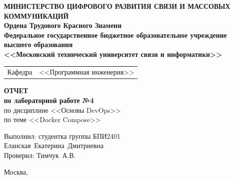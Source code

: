 \thispagestyle{empty}

\begin{center}
	\textbf{МИНИСТЕРСТВО ЦИФРОВОГО РАЗВИТИЯ СВЯЗИ И МАССОВЫХ КОММУНИКАЦИЙ} \\
	\textbf{Ордена Трудового Красного Знамени \\
	Федеральное государственное бюджетное образовательное учреждение высшего образования \\
	<<Московский технический университет связи и информатики>>}
\end{center}

\vspace{0.3em}

\begin{center}
	\begin{tabularx}{0.5\textwidth}{p{1.2cm}X}
		Кафедра & \quad <<Программная инженерия>> \\%
	\end{tabularx}
\end{center}

\vspace{12em}

\begin{center}
	\Large
	\textbf{ОТЧЕТ} \\
	\textbf{по лабораторной работе №4} \\
	\large
	по дисциплине <<Основы DevOps>> \\
	по теме <<Docker Compose>>
\end{center}


\vspace{3em}

\begin{flushright}
	Выполнил: 
	студентка группы БПИ2401 \\
	Еланская~Екатерина~Дмитриевна\\
	Проверил: Тимчук~А.В.\\
\end{flushright}

\vspace{8em}

\begin{center}
	Москва,~\the\year
\end{center}
\clearpage

